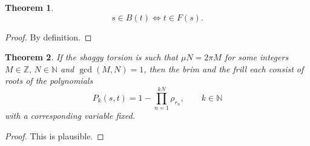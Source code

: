 \documentclass{article}
\theoremstyle{plain}
\newtheorem{theorem}{Theorem}[section]
\theoremstyle{definition}
\begin{document}
    \begin{theorem}
        $$ 
            s \in B(t) \Leftrightarrow t \in F(s)
        .$$
    \end{theorem}
    \begin{proof}
        By definition.
    \end{proof}


    \begin{theorem}
        If the shaggy torsion is such that
        $\mu N = 2\pi M$ for some integers $M \in \mathbb Z,\, N \in \mathbb N$ and  $\gcd(M,N)=1$, then the brim and the frill each consist of roots  of the polynomials$$
            P_k(s,t) = 1 - \prod_{n=1}^{kN} \rho_{r_n}, \qquad k \in \mathbb N      
        $$ with a corresponding variable fixed. 
    \end{theorem}
    \begin{proof}
        This is plausible.%
    \end{proof}
\end{document}
